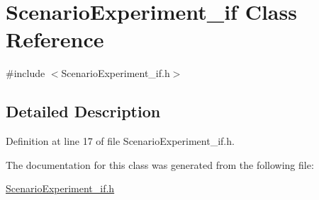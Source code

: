 \hypertarget{class_scenario_experiment__if}{\section{Scenario\-Experiment\-\_\-if Class Reference}
\label{class_scenario_experiment__if}
}


{\ttfamily \#include $<$Scenario\-Experiment\-\_\-if.\-h$>$}



\subsection{Detailed Description}


Definition at line 17 of file Scenario\-Experiment\-\_\-if.\-h.



The documentation for this class was generated from the following file\-:\begin{DoxyCompactItemize}
\item 
\hyperlink{_scenario_experiment__if_8h}{Scenario\-Experiment\-\_\-if.\-h}\end{DoxyCompactItemize}
